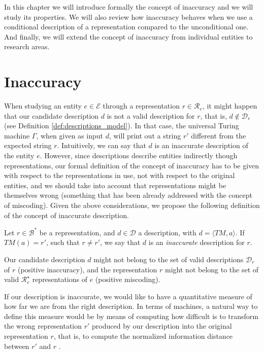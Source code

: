 In this chapter we will introduce formally the concept of inaccuracy and we will study its properties. We will also review how inaccuracy behaves when we use a conditional description of a representation compared to the unconditional one. And finally, we will extend the concept of inaccuracy from individual entities to research areas.

%
%
\section{Inaccuracy}
\label{sec:inaccuracy:inaccuracy}

When studying an entity $e \in \mathcal{E}$ through a representation $r \in \mathcal{R}_e$, it might happen that our candidate description $d$ is not a valid description for $r$, that is, $d \notin \mathcal{D}_r$ (see Definition \ref{def:descriptions_model}). In that case, the universal Turing machine $\Gamma$, when given as input $d$, will print out a string $r'$ different from the expected string $r$. Intuitively, we can say that $d$ is an inaccurate description of the entity $e$. However, since descriptions describe entities indirectly though representations, our formal definition of the concept of inaccuracy has to be given with respect to the representations in use, not with respect to the original entities, and we should take into account that representations might be themselves wrong (something that has been already addressed with the concept of miscoding). Given the above considerations, we propose the following definition of the concept of inaccurate description.

\begin{definition}
Let $r \in \mathcal{B}^\ast$ be a representation, and $d \in \mathcal{D}$ a description, with $ d = \langle TM, a \rangle$. If $TM(a) = r'$, such that $r \neq r'$, we say that $d$ is an \emph{inaccurate} description for $r$.
\end{definition}

Our candidate description $d$ might not belong to the set of valid descriptions $\mathcal{D}_r$ of $r$ (positive inaccuracy), and the representation $r$ might not belong to the set of valid $\mathcal{R}^\star_e$ representations of $e$ (positive miscoding).

If our description is inaccurate, we would like to have a quantitative measure of how far we are from the right description. In terms of machines, a natural way to define this measure would be by means of computing how difficult is to transform the wrong representation $r'$ produced by our description into the original representation $r$, that is, to compute the normalized information distance between $r'$ and $r$ .

